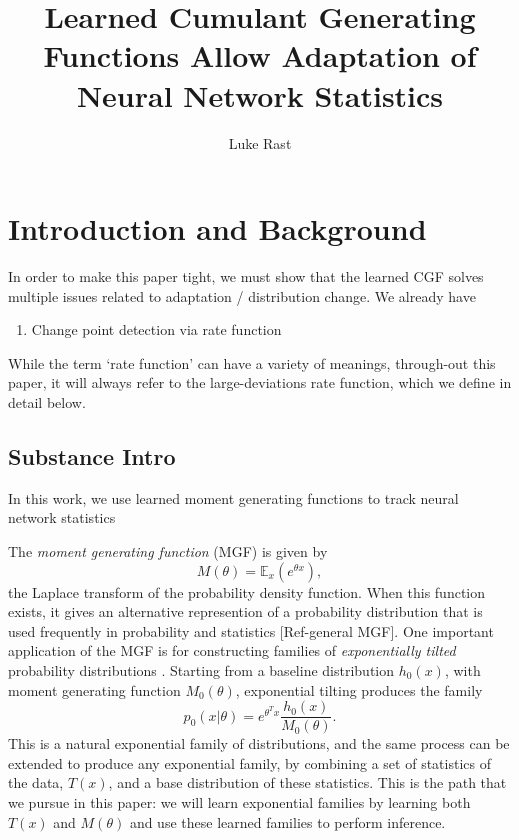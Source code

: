 \documentclass[10pt, twocolumn]{article}      %
\begin{document}
\title{Learned Cumulant Generating Functions Allow Adaptation of Neural Network Statistics}
\author{Luke Rast}
\maketitle
\linenumbers

\section{Introduction and Background}







In order to make this paper tight, we must show that the learned CGF solves multiple issues related to adaptation / distribution change.
We already have
\begin{enumerate}
  \item Change point detection via rate function
\end{enumerate}



While the term `rate function' can have a variety of meanings, through-out this paper, it will always refer to the large-deviations rate function, which we define in detail below.





\subsection{Substance Intro}


In this work, we use learned moment generating functions to track neural network statistics 


The \textit{moment generating function} (MGF) is given by
\begin{equation}
  M(\theta) = \mathbb{E}_x(e^{\theta x}),
\end{equation}
the Laplace transform of the probability density function.
When this function exists, it gives an alternative represention of a probability distribution that is used frequently in probability and statistics [Ref-general MGF].
One important application of the MGF is for constructing families of \textit{exponentially tilted} probability distributions \cite{morris_natural_1982,morris_unifying_2009}.
Starting from a baseline distribution $h_0(x)$, with moment generating function $M_0(\theta)$, exponential tilting produces the family
\begin{equation}
  p_0(x | \theta) = e^{\theta^T x} \frac{h_0(x)}{M_0(\theta)}.
\end{equation}
This is a natural exponential family of distributions, and the same process can be extended to produce any exponential family, by combining a set of statistics of the data, $T(x)$, and a base distribution of these statistics.
This is the path that we pursue in this paper: we will learn exponential families by learning both $T(x)$ and $M(\theta)$ and use these learned families to perform inference.
\end{document}
